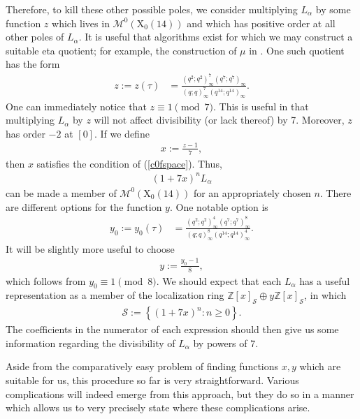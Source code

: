 \documentclass[reqno]{amsart}
\theoremstyle{definition}
\theoremstyle{remark}
\numberwithin{equation}{section}
\begin{document}
Therefore, to kill these other possible poles, we consider multiplying $L_{\alpha}$ by some function $z$ which lives in $\mathcal{M}^{0}\left( \mathrm{X}_0(14) \right)$ and which has positive order at all other poles of $L_{\alpha}$.  It is useful that algorithms exist for which we may construct a suitable eta quotient; for example, the construction of $\mu$ in \cite{Radu}.  One such quotient has the form
\begin{align*}
z := z(\tau) &= \frac{(q^2;q^2)_{\infty}^{7}(q^7;q^7)_{\infty}}{(q;q)_{\infty}^7 (q^{14};q^{14})_{\infty}}.
\end{align*}  One can immediately notice that $z\equiv 1\pmod{7}$.  This is useful in that multiplying $L_{\alpha}$ by $z$ will not affect divisibility (or lack thereof) by 7.  Moreover, $z$ has order $-2$ at $[0]$.  If we define 
\begin{align*}
x := \frac{z-1}{7},
\end{align*} then $x$ satisfies the condition of (\ref{c0fspace}).  Thus,
\begin{align*}
(1+7x)^n L_{\alpha}
\end{align*}  can be made a member of $\mathcal{M}^{0}\left( \mathrm{X}_0(14) \right)$ for an appropriately chosen $n$. There are different options for the function $y$.  One notable option is 
\begin{align*}
y_0 := y_0(\tau) &= \frac{(q^2;q^2)_{\infty}^{4}(q^7;q^7)_{\infty}^8}{(q;q)_{\infty}^8 (q^{14};q^{14})_{\infty}^4}.
\end{align*}  It will be slightly more useful to choose
\begin{align*}
y := \frac{y_0-1}{8},
\end{align*} which follows from $y_0\equiv 1\pmod{8}$.  We should expect that each $L_{\alpha}$ has a useful representation as a member of the localization ring $\mathbb{Z}[x]_{\mathcal{S}}\oplus y\mathbb{Z}[x]_{\mathcal{S}}$, in which
\begin{align*}
\mathcal{S} := \left\{ (1+7x)^n : n\ge 0 \right\}.
\end{align*}  The coefficients in the numerator of each expression should then give us some information regarding the divisibility of $L_{\alpha}$ by powers of 7.

Aside from the comparatively easy problem of finding functions $x,y$ which are suitable for us, this procedure so far is very straightforward.  Various complications will indeed emerge from this approach, but they do so in a manner which allows us to very precisely state where these complications arise.
\end{document}
